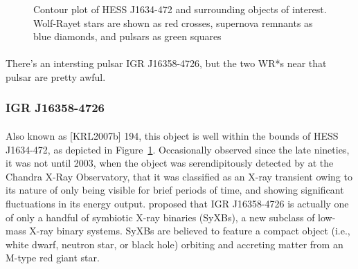 \documentclass[a4paper, titlepage, oneside]{article}
\begin{document}
\begin{multicols}{2}
\begin{figure}[H]
  \centering
  \caption{Contour plot of HESS J1634-472 and surrounding objects of interest. Wolf-Rayet stars are shown as red crosses, supernova remnants as blue diamonds, and pulsars as green squares}
  \label{fig:hess34}
\end{figure}

\paragraph{}
There's an intersting pulsar IGR J16358-4726, but the two WR*s near that pulsar are pretty awful.

\subsubsection{IGR J16358-4726}
\paragraph{}
Also known as [KRL2007b] 194, this object is well within the bounds of HESS J1634-472, as depicted in Figure~\ref{fig:hess34}. Occasionally observed since the late nineties, it was not until 2003, when the object was serendipitously detected by \textcite{Patel:2004} at the Chandra X-Ray Observatory, that it was classified as an X-ray transient owing to its nature of only being visible for brief periods of time, and showing significant fluctuations in its energy output. \textcite{Nespoli:2010} proposed that IGR J16358-4726 is actually one of only a handful of symbiotic X-ray binaries (SyXBs), a new subclass of low-mass X-ray binary systems. SyXBs are believed to feature a compact object (i.e., white dwarf, neutron star, or black hole) orbiting and accreting matter from an M-type red giant star.


\end{multicols}
\end{document}

